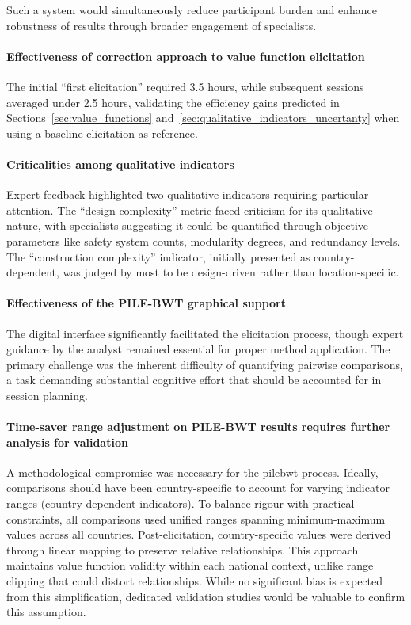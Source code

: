 Such a system would simultaneously reduce participant burden and enhance robustness of results through broader engagement of specialists.

\paragraph{Effectiveness of correction approach to value function elicitation}
The initial “first elicitation” required 3.5 hours, while subsequent sessions averaged under 2.5 hours, validating the efficiency gains predicted in Sections~\ref{sec:value_functions} and~\ref{sec:qualitative_indicators_uncertanty} when using a baseline elicitation as reference.

\paragraph{Criticalities among qualitative indicators}
Expert feedback highlighted two qualitative indicators requiring particular attention. The “design complexity” metric faced criticism for its qualitative nature, with specialists suggesting it could be quantified through objective parameters like safety system counts, modularity degrees, and redundancy levels. The “construction complexity” indicator, initially presented as country-dependent, was judged by most to be design-driven rather than location-specific. 

\paragraph{Effectiveness of the PILE-BWT graphical support}
The digital interface significantly facilitated the elicitation process, though expert guidance by the analyst remained essential for proper method application. The primary challenge was the inherent difficulty of quantifying pairwise comparisons, a task demanding substantial cognitive effort that should be accounted for in session planning.

\paragraph{Time-saver range adjustment on PILE-BWT results requires further analysis for validation}
A methodological compromise was necessary for the \gls{pilebwt} process. Ideally, comparisons should have been country-specific to account for varying indicator ranges (country-dependent indicators). To balance rigour with practical constraints, all comparisons used unified ranges spanning minimum-maximum values across all countries. Post-elicitation, country-specific values were derived through linear mapping to preserve relative relationships. This approach maintains value function validity within each national context, unlike range clipping that could distort relationships. While no significant bias is expected from this simplification, dedicated validation studies would be valuable to confirm this assumption.

